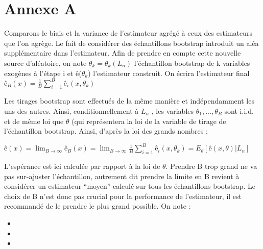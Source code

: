 \chapter{Annexe A\cite{ESL}}
	Comparons le biais et la variance de l’estimateur agrégé à ceux des estimateurs que l’on agrège.
	Le fait de considérer des échantillons bootstrap introduit un aléa supplémentaire dans l’estimateur. Afin de prendre en compte cette nouvelle source d’aléatoire, on note $\theta_k = \theta_k(L_n)$ l’échantillon bootstrap de k variables exogènes à l’étape i et ê($\theta_k$) l’estimateur construit. On écrira l'estimateur final ${ê_B(x) =  \frac{1}{B} \sum_{i=1}^{B} ê_i(x,\theta_k)}$
	\par
	Les tirages bootstrap sont effectués de la même manière et indépendamment les uns des autres.
	Ainsi, conditionnellement à $L_n$ , les variables $\theta_1,..., \theta_B$ sont i.i.d. et de même loi que $\theta$ (qui représentera la loi de la variable de tirage de l’échantillon bootstrap. Ainsi, d’après la loi des grands nombres :
	\begin{center}
		${ê(x) = \lim_{B \to \infty} ê_B(x) = \lim_{B \to \infty} \frac{1}{B} \sum_{i=1}^{B} ê_i(x,\theta_k) = E_\theta[ê(x,\theta) | L_n]  }$
	\end{center}
	L’espérance est ici calculée par rapport à la loi de $\theta$. Prendre B trop grand ne va pas sur-ajuster l’échantillon, autrement dit prendre la limite en B revient à considérer un estimateur “moyen” calculé sur tous les échantillons bootstrap. Le choix de B n’est donc pas crucial pour la performance de l’estimateur, il est recommandé de le prendre le plus grand possible. On note :
	\begin{itemize}
	\item 
	
	\item 
	\item
	\end{itemize}
